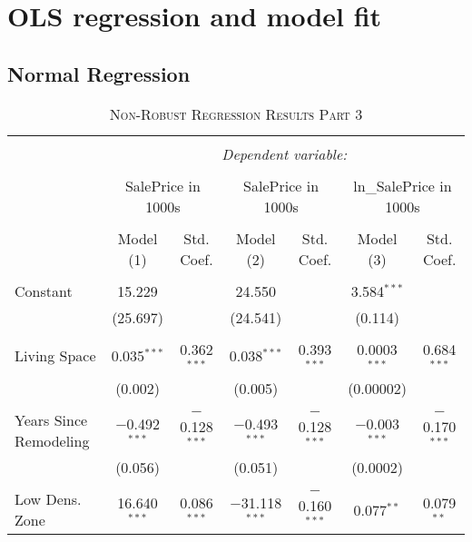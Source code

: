 \documentclass[a4paper]{article}
\begin{document}
\section{OLS regression and model fit}
\subsection{Normal Regression}

\begin{table}[!htbp] \centering 
\begin{adjustwidth}{0.cm}{-0cm}
\begin{threeparttable}
\small
\captionsetup{font=small, justification=raggedright,singlelinecheck=false}
\caption{\textsc{Non-Robust Regression Results Part 3}}
\centering 
  \label{}
\small 
\begin{tabular}{@{\extracolsep{-2pt}}lcccccc} 
\\[-5.8ex]\hline 
\hline \\[-1.8ex] 
 & \multicolumn{6}{c}{\textit{Dependent variable:}} \\ 
\cline{2-7} 
\\[-1.8ex] & \multicolumn{2}{c}{SalePrice in 1000s} & \multicolumn{2}{c}{SalePrice in 1000s} & \multicolumn{2}{c}{ln\_SalePrice  in 1000s} \\ 
\\[-1.8ex] & Model (1) & Std. Coef.& Model (2) & Std. Coef.&  Model (3) & Std. Coef.\\ 
\hline \\[-1.8ex] 
 Constant & 15.229 &  & 24.550 &  & 3.584$^{***}$ &  \\ 
  & (25.697) &  & (24.541) &  & (0.114) & \\ 
  & & & & & & \\ 
 Living Space & 0.035$^{***}$ & 0.362$^{***}$ & 0.038$^{***}$ & 0.393$^{***}$ & 0.0003$^{***}$ & 0.684$^{***}$ \\ 
  & (0.002) & & (0.005) & & (0.00002) &  \\ 
  & & & & & & \\ 
 Years Since Remodeling & $-$0.492$^{***}$ & $-$0.128$^{***}$ & $-$0.493$^{***}$ & $-$0.128$^{***}$ & $-$0.003$^{***}$ & $-$0.170$^{***}$ \\ 
  & (0.056) &  & (0.051) &  & (0.0002) &  \\ 
  & & & & & & \\ 
 Low Dens. Zone & 16.640$^{***}$ & 0.086$^{***}$ & $-$31.118$^{***}$ & $-$0.160$^{***}$ & 0.077$^{**}$ & 0.079$^{**}$ \\ 

\end{tabular}
\end{threeparttable}
\end{adjustwidth}
\end{table}
\end{document}
